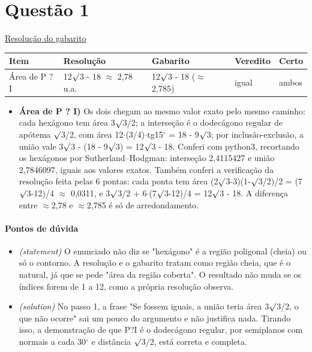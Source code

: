 \documentclass{article}%
\begin{document}
\section*{Questão 1}%
\href{https://poliedroresolve.sistemapoliedro.com.br/vestibulares/ime/2027/ime-2-fase-dia-1-26-10-2026-2-fase-dia-1/dissertativa-1-matematica-2-fase-dia-1-ime-2027}{Resolução do gabarito}\par\smallskip%
\begin{longtable}{@{}p{} p{} p{} p{} p{}@{}}\toprule Item & Resolução & Gabarito & Veredito & Certo \\ \midrule
Área de P ? I & 12$\surd$3 - 18 $\approx$ 2,78 u.a. & 12$\surd$3 - 18 ($\approx$ 2,785) & igual & ambos \\
\bottomrule\end{longtable}%
\begin{itemize}%
\item%
\textbf{Área de P ? I)} Os dois chegam ao mesmo valor exato pelo mesmo caminho: cada hexágono tem área 3$\surd$3/2; a interseção é o dodecágono regular de apótema $\surd$3/2, com área 12$\cdot$(3/4)$\cdot$tg15$^\circ$ = 18 - 9$\surd$3; por inclusão{-}exclusão, a união vale 3$\surd$3 - (18 - 9$\surd$3) = 12$\surd$3 - 18. Conferi com python3, recortando os hexágonos por Sutherland--Hodgman: interseção 2,4115427 e união 2,7846097, iguais aos valores exatos. Também conferi a verificação da resolução feita pelas 6 pontas: cada ponta tem área (2$\surd$3-3)(1-$\surd$3/2)/2 = (7$\surd$3-12)/4 $\approx$ 0,0311, e 3$\surd$3/2 + 6$\cdot$(7$\surd$3-12)/4 = 12$\surd$3 - 18. A diferença entre $\approx$2,78 e $\approx$2,785 é só de arredondamento.%
\end{itemize}%
\paragraph{Pontos de dúvida}%
\begin{itemize}%
\item%
\textit{(statement)} O enunciado não diz se "hexágono" é a região poligonal (cheia) ou só o contorno. A resolução e o gabarito tratam como região cheia, que é o natural, já que se pede "área da região coberta". O resultado não muda se os índices forem de 1 a 12, como a própria resolução observa.%
\item%
\textit{(solution)} No passo 1, a frase "Se fossem iguais, a união teria área 3$\surd$3/2, o que não ocorre" sai um pouco do argumento e não justifica nada. Tirando isso, a demonstração de que P?I é o dodecágono regular, por semiplanos com normais a cada 30$^\circ$ e distância $\surd$3/2, está correta e completa.%
\end{itemize}%
\end{document}
